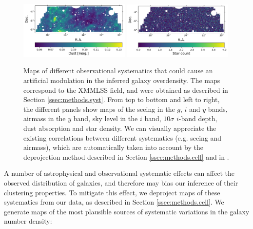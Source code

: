 \documentclass[a4paper,11pt]{article}
\begin{document}
\begin{figure}
      \includegraphics[width=0.49\textwidth]{figures/syst_dust.pdf}
      \includegraphics[width=0.49\textwidth]{figures/syst_star.pdf}
      \caption{Maps of different observational systematics that could cause an artificial modulation in the inferred galaxy overdensity. The maps correspond to the XMMLSS field, and were obtained as described in Section \ref{ssec:methods.syst}. From top to bottom and left to right, the different panels show maps of the seeing in the $g$, $i$ and $y$ bands, airmass in the $y$ band, sky level in the $i$ band, $10\sigma$ $i$-band depth, dust absorption and star density. We can visually appreciate the existing correlations between different systematics (e.g. seeing and airmass), which are automatically taken into account by the deprojection method described in Section \ref{ssec:methods.cell} and in \cite{2019MNRAS.484.4127A}.}
      \label{fig:sysmap}
    \end{figure}
    A number of astrophysical and observational systematic effects can affect the observed distribution of galaxies, and therefore may bias our inference of their clustering properties. To mitigate this effect, we deproject maps of these systematics from our data, as described in Section \ref{ssec:methods.cell}. We generate maps of the most plausible sources of systematic variations in the galaxy number density:
\end{document}
